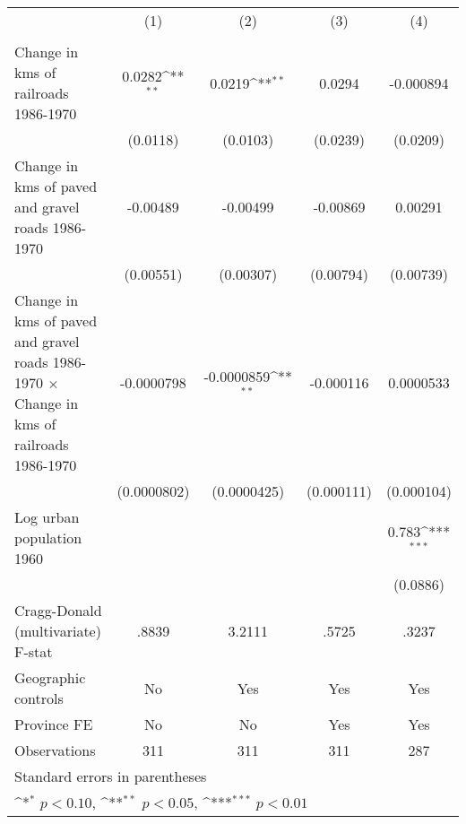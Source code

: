 {
\def\sym#1{\ifmmode^{#1}\else\(^{#1}\)\fi}
\begin{tabular}{l*{4}{c}}
\hline\hline
                &\multicolumn{1}{c}{(1)}&\multicolumn{1}{c}{(2)}&\multicolumn{1}{c}{(3)}&\multicolumn{1}{c}{(4)}\\
                &\multicolumn{1}{c}{}&\multicolumn{1}{c}{}&\multicolumn{1}{c}{}&\multicolumn{1}{c}{}\\
\hline
Change in kms of railroads 1986-1970&   0.0282\sym{**} &   0.0219\sym{**} &   0.0294         &-0.000894         \\
                & (0.0118)         & (0.0103)         & (0.0239)         & (0.0209)         \\
[1em]
Change in kms of paved and gravel roads 1986-1970& -0.00489         & -0.00499         & -0.00869         &  0.00291         \\
                &(0.00551)         &(0.00307)         &(0.00794)         &(0.00739)         \\
[1em]
Change in kms of paved and gravel roads 1986-1970 $\times$ Change in kms of railroads 1986-1970&-0.0000798         &-0.0000859\sym{**} &-0.000116         &0.0000533         \\
                &(0.0000802)         &(0.0000425)         &(0.000111)         &(0.000104)         \\
[1em]
Log urban population 1960&                  &                  &                  &    0.783\sym{***}\\
                &                  &                  &                  & (0.0886)         \\
\hline
Cragg-Donald (multivariate) F-stat&    .8839         &   3.2111         &    .5725         &    .3237         \\
Geographic controls&       No         &      Yes         &      Yes         &      Yes         \\
Province FE     &       No         &       No         &      Yes         &      Yes         \\
Observations    &      311         &      311         &      311         &      287         \\
\hline\hline
\multicolumn{5}{l}{\footnotesize Standard errors in parentheses}\\
\multicolumn{5}{l}{\footnotesize \sym{*} \(p<0.10\), \sym{**} \(p<0.05\), \sym{***} \(p<0.01\)}\\
\end{tabular}
}
